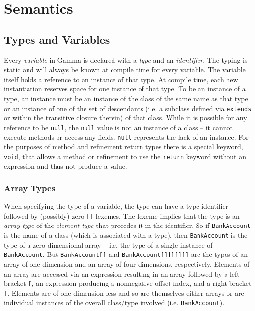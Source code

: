 \section{Semantics}

\subsection{Types and Variables}
Every \textit{variable} in Gamma is declared with a \textit{type} and an \textit{identifier}. The typing is static and will always be known at compile time for every variable. The variable itself holds a reference to an instance of that type. At compile time, each new instantiation reserves space for one instance of that type. To be an instance of a type, an instance must be an instance of the class of the same name as that type or an instance of one of the set of descendants (i.e. a subclass defined via \verb!extends! or within the transitive closure therein) of that class. While it is possible for any reference to be \verb!null!, the \verb!null! value is not an instance of a class -- it cannot execute methods or access any fields. \verb!null! represents the lack of an instance. For the purposes of method and refinement return types there is a special keyword, \verb!void!, that allows a method or refinement to use the \verb!return! keyword without an expression and thus not produce a value.

\subsubsection{Array Types}
When specifying the type of a variable, the type can have a type identifier followed by (possibly) zero \verb![]! lexemes. The lexeme implies that the type is an \textit{array type} of the \textit{element type} that precedes it in the identifier. So if \verb!BankAccount! is the name of a class (which is associated with a type), then \verb!BankAccount! is the type of a zero dimensional array -- i.e. the type of a single instance of \verb!BankAccount!. But \verb!BankAccount[]! and \verb!BankAccount[][][][]! are the types of an array of one dimension and an array of four dimensions, respectively. Elements of an array are accessed via an expression resulting in an array followed by a left bracket \verb![!, an expression producing a nonnegative offset index, and a right bracket \verb!]!. Elements are of one dimension less and so are themselves either arrays or are individual instances of the overall class/type involved (i.e. \verb!BankAccount!).

